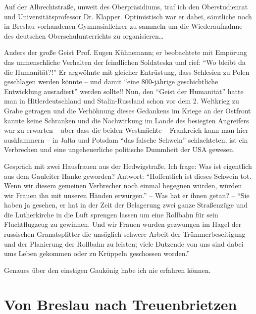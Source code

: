 \documentclass[a5paper,pagesize,10pt,twoside=true]{scrbook}
\renewcommand{\marginpar}[2][]{}
\begin{document}
Auf der Albrechtstraße, unweit des Oberpräsidiums, traf ich den Oberstudienrat und Universitätsprofessor Dr. Klapper. Optimistisch war er dabei, sämtliche noch in Breslau vorhandenen Gymnasiallehrer zu sammeln um die Wiederaufnahme des deutschen Oberschulunterrichts zu organisieren\dots

Anders der große Geist Prof. Eugen Kühnemann; er beobachtete mit Empörung das unmenschliche Verhalten der feindlichen Soldateska und rief: \enquote{Wo bleibt da die Humanität?!} Er argwöhnte mit gleicher Entrüstung, dass Schlesien zu Polen geschlagen werden könnte -- und damit \enquote{eine 800-jährige geschichtliche Entwicklung ausradiert} werden sollte!! \marginpar{100} Nun, den \enquote{Geist der Humanität} hatte man in Hitlerdeutschland und Stalin-Russland schon vor dem 2. Weltkrieg zu Grabe getragen und die Verhöhnung dieses Gedankens im Kriege an der Ostfront kannte keine Schranken und die Nachwirkung im Lande des besiegten Angreifers war zu erwarten -- aber dass die beiden Westmächte -- Frankreich kann man hier ausklammern -- in Jalta und Potsdam \enquote{das falsche Schwein} schlachteten, ist ein Verbrechen und eine ungeheuerliche politische Dummheit der USA gewesen.

Gespräch mit zwei Hausfrauen aus der Hedwigstraße. Ich frage: Was ist eigentlich aus dem Gauleiter Hanke geworden? Antwort: \enquote{Hoffentlich ist dieses Schwein tot. Wenn wir diesem gemeinen Verbrecher noch einmal begegnen würden, würden wir Frauen ihn mit unseren Händen erwürgen.} -- Was hat er ihnen getan? -- \enquote{Sie haben ja gesehen, er hat in der Zeit der Belagerung zwei ganze Straßenzüge und die Lutherkirche in die Luft sprengen lassen um eine Rollbahn für sein Fluchtflugzeug zu gewinnen. Und wir Frauen wurden gezwungen im Hagel der \marginpar{101} russischen Granatsplitter die unsäglich schwere Arbeit der Trümmerbeseitigung und der Planierung der Rollbahn zu leisten; viele Dutzende von uns sind dabei ums Leben gekommen oder zu Krüppeln geschossen worden.}

Genaues über den einstigen Gaukönig habe ich nie erfahren können.

\section{Von Breslau nach Treuenbrietzen}
\end{document}
